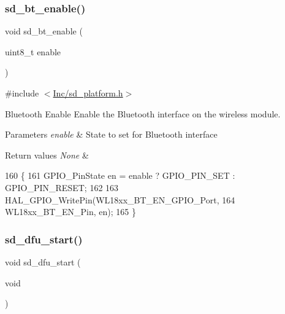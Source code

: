 \subsubsection{\texorpdfstring{sd\+\_\+bt\+\_\+enable()}{sd\_bt\_enable()}}
{\footnotesize\ttfamily void sd\+\_\+bt\+\_\+enable (\begin{DoxyParamCaption}\item[{uint8\+\_\+t}]{enable }\end{DoxyParamCaption})}



{\ttfamily \#include $<$\mbox{\hyperlink{sd__platform_8h}{Inc/sd\+\_\+platform.\+h}}$>$}



Bluetooth Enable Enable the Bluetooth interface on the wireless module. 


\begin{DoxyParams}{Parameters}
{\em enable} & State to set for Bluetooth interface \\
\hline
\end{DoxyParams}

\begin{DoxyRetVals}{Return values}
{\em None} & \\
\hline
\end{DoxyRetVals}

\begin{DoxyCode}
160 \{
161     GPIO\_PinState en = enable ? GPIO\_PIN\_SET : GPIO\_PIN\_RESET;
162     
163     HAL\_GPIO\_WritePin(WL18xx\_BT\_EN\_GPIO\_Port, 
164               WL18xx\_BT\_EN\_Pin, en);
165 \}
\end{DoxyCode}
\mbox{\label{group___s_d___platform___function___declarations_ga405f1d2a69e1cf1f3d1ddbcbc3063651}} 
\subsubsection{\texorpdfstring{sd\+\_\+dfu\+\_\+start()}{sd\_dfu\_start()}}
{\footnotesize\ttfamily void sd\+\_\+dfu\+\_\+start (\begin{DoxyParamCaption}\item[{void}]{ }\end{DoxyParamCaption})}



